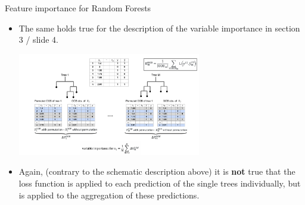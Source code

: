 \begin{vbframe}{Feature importance for Random Forests}
\begin{itemize}
\item The same holds true for the description of the variable importance in section 3 / slide 4.
\begin{center}
\includegraphics[width = 8cm]{figure_man/rF_varImp_permutation_new.pdf}
\end{center}
\item Again, (contrary to the schematic description above) it is \textbf{not} true that the loss function is applied to each prediction of the single trees  individually, but is applied to the aggregation of these predictions. 
\end{itemize}
\end{vbframe}

\endlecture

